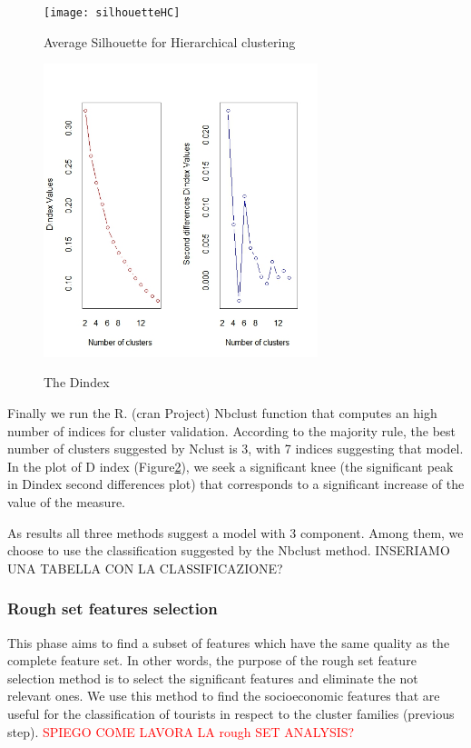 \documentclass[a4paper]{article}
\begin{document}
\begin{figure}[h]
  \centering
    \texttt{[image: silhouetteHC]}\\
  \caption{Average Silhouette for Hierarchical clustering}\label{silHC}
\end{figure}


\begin{figure}[h]
  \centering
    \includegraphics[width=8cm]{NbClust}\\
  \caption{The Dindex}\label{NbClust}
\end{figure}
Finally we run the R. (cran Project) Nbclust function that computes an high number of indices for cluster validation. According to the majority rule, the best number of clusters suggested by Nclust is 3, with 7 indices suggesting that model. In the plot of D index (Figure\ref {NbClust}), we seek a significant knee (the significant peak in Dindex second differences plot) that corresponds to a significant increase of the value of the measure.

As results all three methods suggest a model with 3 component. Among them, we choose to use the classification suggested by the Nbclust method. INSERIAMO UNA TABELLA CON LA CLASSIFICAZIONE?

\subsubsection{Rough set features selection}
This phase aims to find a subset of features which have the same quality as the complete feature set. In other words, the purpose of the rough set feature selection method is to select the significant features and eliminate the not relevant ones.
We use this method to find the socioeconomic features that are useful for the classification of tourists in respect to the cluster families (previous step).
\textcolor{red}{SPIEGO COME LAVORA LA rough SET ANALYSIS?}
\end{document}
